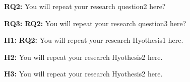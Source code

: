 \textbf{RQ2:} You will repeat your research question2 here?\par

\textbf{RQ3:} \textbf{RQ2:} You will repeat your research question3 here?\par\par

\textbf{H1:} \textbf{RQ2:} You will repeat your research Hyothesis1 here.\par

\textbf{H2:} You will repeat your research Hyothesis2 here.\par

\textbf{H3:} You will repeat your research Hyothesis2 here.\par



